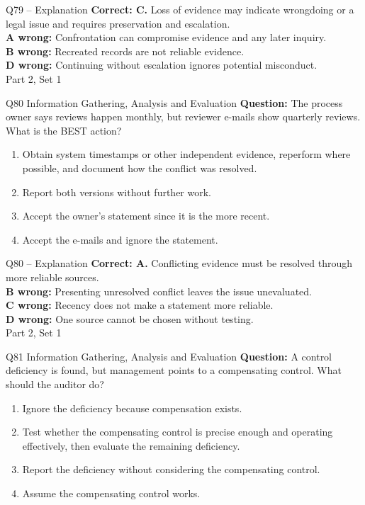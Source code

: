 \documentclass[aspectratio=169,10pt]{beamer}
\begin{document}
\begin{frame}[t]{Q79 -- Explanation}
	\footnotesize
	\textbf{Correct: C.} Loss of evidence may indicate wrongdoing or a legal issue and requires preservation and escalation. \\[5pt]
\textbf{A wrong:} Confrontation can compromise evidence and any later inquiry. \\[3pt]
\textbf{B wrong:} Recreated records are not reliable evidence. \\[3pt]
\textbf{D wrong:} Continuing without escalation ignores potential misconduct. \\[3pt]
	\vfill {\tiny Part 2, Set 1}
\end{frame}
\begin{frame}[t]{Q80 \hfill {\scriptsize Information Gathering, Analysis and Evaluation}}
	\small
	\textbf{Question:} The process owner says reviews happen monthly, but reviewer e-mails show quarterly reviews. What is the BEST action?
	\begin{enumerate}[label=\Alph*.,itemsep=1pt,topsep=3pt]
			\item Obtain system timestamps or other independent evidence, reperform where possible, and document how the conflict was resolved.
			\item Report both versions without further work.
			\item Accept the owner's statement since it is the more recent.
			\item Accept the e-mails and ignore the statement.
	\end{enumerate}
\end{frame}
\begin{frame}[t]{Q80 -- Explanation}
	\footnotesize
	\textbf{Correct: A.} Conflicting evidence must be resolved through more reliable sources. \\[5pt]
\textbf{B wrong:} Presenting unresolved conflict leaves the issue unevaluated. \\[3pt]
\textbf{C wrong:} Recency does not make a statement more reliable. \\[3pt]
\textbf{D wrong:} One source cannot be chosen without testing. \\[3pt]
	\vfill {\tiny Part 2, Set 1}
\end{frame}
\begin{frame}[t]{Q81 \hfill {\scriptsize Information Gathering, Analysis and Evaluation}}
	\small
	\textbf{Question:} A control deficiency is found, but management points to a compensating control. What should the auditor do?
	\begin{enumerate}[label=\Alph*.,itemsep=1pt,topsep=3pt]
			\item Ignore the deficiency because compensation exists.
			\item Test whether the compensating control is precise enough and operating effectively, then evaluate the remaining deficiency.
			\item Report the deficiency without considering the compensating control.
			\item Assume the compensating control works.
	\end{enumerate}
\end{frame}
\end{document}
